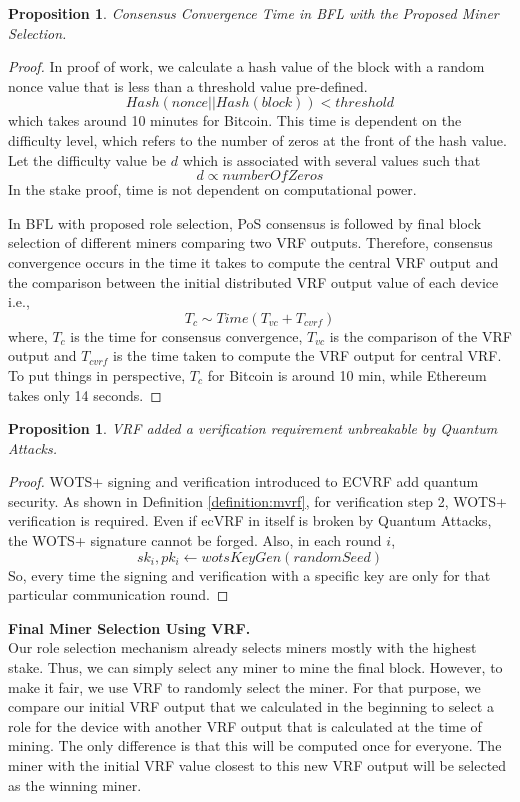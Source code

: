 \documentclass[5p,times]{elsarticle}
\newtheorem{prop}[thm]{Proposition}
\theoremstyle{definition}
\theoremstyle{remark}
\numberwithin{equation}{section}
\begin{document}
\begin{prop}
Consensus Convergence Time in BFL with the Proposed Miner Selection.
\end{prop}
\begin{proof}
In proof of work, we calculate a hash value of the block with a random nonce value that is less than a
threshold value pre-defined.
$$Hash(nonce || Hash(block)) < threshold$$ which takes around 10 minutes for Bitcoin.
This time is dependent on the difficulty level, which refers to the number of zeros at the front of the hash value.
Let the difficulty value be $d$ which is associated with several values such that $$ d \propto numberOfZeros$$
In the stake proof, time is not dependent on computational power.

In BFL with proposed role selection, PoS consensus is followed by final block selection of different
miners comparing two VRF outputs.
Therefore, consensus convergence occurs in the time it takes to compute the central VRF output and the comparison
between the initial distributed VRF output value of each device i.e.,
$$T_{c} \sim Time(T_{vc} + T_{cvrf})$$
where, $T_c$ is the time for consensus convergence, $T_{vc}$ is the comparison of the VRF output and $T_{cvrf}$ is the time taken to compute the VRF output for
central VRF.
To put things in perspective, $T_{c}$ for Bitcoin is around 10 min, while Ethereum takes only 14 seconds. 
\end{proof}


\begin{prop}
VRF added a verification requirement unbreakable by Quantum Attacks.
\end{prop}
\begin{proof}
WOTS+ signing and verification introduced to ECVRF add quantum security.
As shown in Definition \ref{definition:mvrf}, for verification step 2, WOTS+ verification is required.
Even if ecVRF in itself is broken by Quantum Attacks, the WOTS+ signature cannot be forged.
Also, in each round $i$, 
$$sk_i, pk_i \leftarrow wotsKeyGen(randomSeed) $$
So, every time the signing and verification with a specific key are only for that particular communication round.
\end{proof}

\noindent \textbf{Final Miner Selection Using VRF.}\\
Our role selection mechanism already selects miners
mostly with the highest stake. 
Thus, we can simply select any miner to mine the
final block.
However, to make it fair, we use VRF to randomly select
the miner.
For that purpose, we compare our initial VRF output that
we calculated in the beginning to select a role
for the device with another VRF output that is calculated
at the time of mining.
The only difference is that this will be computed once
for everyone.
The miner with the initial VRF value closest to this
new VRF output will be selected as the winning miner.
\end{document}
